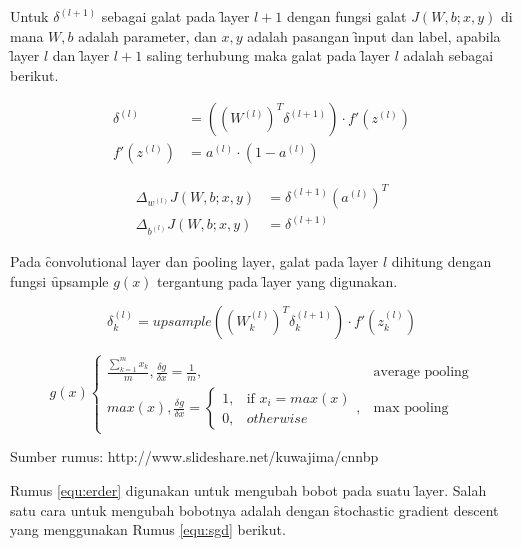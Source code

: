 Untuk $\delta^{(l+1)}$ sebagai galat pada \f{layer} $l+1$ dengan fungsi galat $J(W,b;x,y)$ di mana $W,b$ adalah parameter, dan $x,y$ adalah pasangan \f{input} dan label, apabila \f{layer} $l$ dan \f{layer} $l+1$ saling terhubung maka galat pada \f{layer} $l$ adalah sebagai berikut.


\begin{equation}
\begin{aligned}
\delta^{(l)} &= ((W^{(l)})^{T}\delta^{(l+1)}) \cdot f'(z^{(l)}) \\
f'(z^{(l)}) &= a^{(l)} \cdot (1-a^{(l)})
\end{aligned}
\end{equation}

\begin{equation}
\label{equ:erder}
\begin{aligned}
\Delta_{w^{(l)}}J(W,b;x,y)&=\delta^{(l+1)}(a^{(l)})^{T} \\
\Delta_{b^{(l)}}J(W,b;x,y)&=\delta^{(l+1)}
\end{aligned}
\end{equation}

Pada \f{convolutional layer} dan \f{pooling layer}, galat pada \f{layer} $l$ dihitung dengan fungsi \f{upsample} $g(x)$ tergantung pada \f{layer} yang digunakan.

\begin{equation}
\label{equ:errorc}
\delta^{(l)}_{k} = upsample((W^{(l)}_{k})^{T}\delta^{(l+1)}_{k}) \cdot f'(z^{(l)}_{k}) 
\end{equation}

\[
g(x)
\begin{cases}
\frac{\sum_{k=1}^{m} x_{k}}{m}, \frac{\delta g}{\delta x} = \frac{1}{m}, & \text{average pooling} \\
max(x), \frac{\delta g}{\delta x} =
\begin{cases}
1, & \text{if } x_{i} = max(x) \\
0, & otherwise
\end{cases}
, & \text{max pooling}
\end{cases}
\]

\begin{center}
	{\small Sumber rumus: http://www.slideshare.net/kuwajima/cnnbp}
\end{center}

Rumus \ref{equ:erder} digunakan untuk mengubah bobot pada suatu \f{layer}. Salah satu cara untuk mengubah bobotnya adalah dengan \f{stochastic gradient descent} yang menggunakan Rumus \ref{equ:sgd} berikut.

